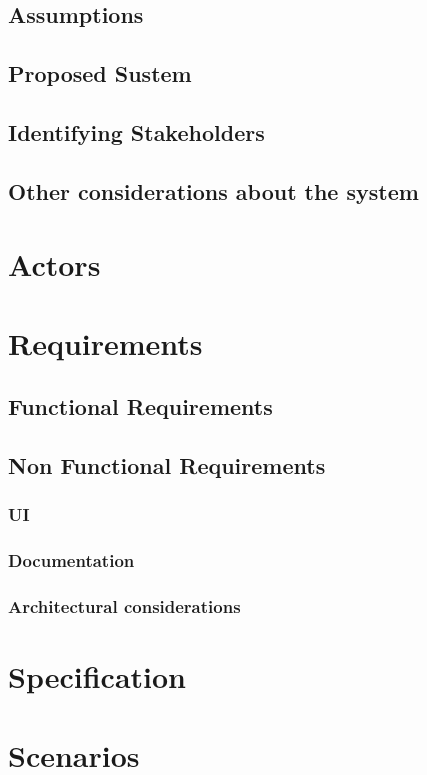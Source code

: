 \documentclass{article}
\begin{document}
\subsection{Assumptions}
\subsection{Proposed Sustem}
\subsection{Identifying Stakeholders}
\subsection{Other considerations about the system}
\section{Actors}
\section{Requirements}
\subsection{Functional Requirements}
\subsection{Non Functional Requirements}
\subsubsection{UI}
\subsubsection{Documentation}
\subsubsection{Architectural considerations}
\section{Specification}
\section{Scenarios}
\end{document}
